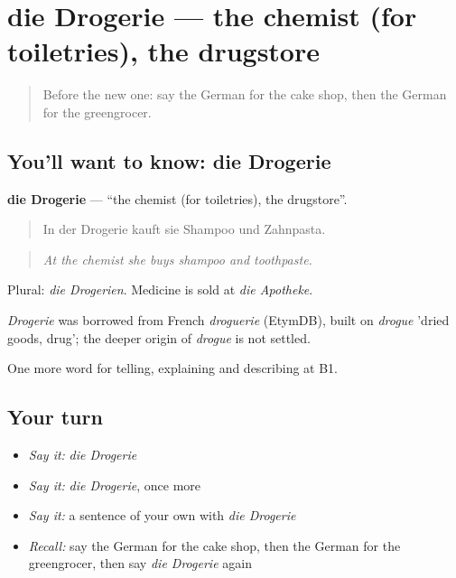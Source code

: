 \section[die Drogerie]{die Drogerie — the chemist (for toiletries), the drugstore}

\label{lesson:GE-C443-drogerie}



\begin{quote}
Before the new one: say the German for the cake shop, then the German for the greengrocer.
\end{quote}

\subsection*{You'll want to know: die Drogerie}
\textbf{die Drogerie} — \textquotedblleft{}the chemist (for toiletries), the drugstore\textquotedblright{}.

\begin{quote}
In der Drogerie kauft sie Shampoo und Zahnpasta.
\end{quote}

\begin{quote}
\emph{At the chemist she buys shampoo and toothpaste.}
\end{quote}

Plural: \emph{die Drogerien}. Medicine is sold at \emph{die Apotheke}.

\begin{cousinweb}
\emph{Drogerie} was borrowed from French \emph{droguerie} (EtymDB), built on \emph{drogue} 'dried goods, drug'; the deeper origin of \emph{drogue} is not settled.
\end{cousinweb}

\begin{grammarlens}[title={What you've built}]
One more word for telling, explaining and describing at B1.
\end{grammarlens}

\subsection*{Your turn}
\begin{itemize}
\raggedright
  \item \emph{Say it:} \emph{die Drogerie}
  \item \emph{Say it:} \emph{die Drogerie}, once more
  \item \emph{Say it:} a sentence of your own with \emph{die Drogerie}
  \item \emph{Recall:} say the German for the cake shop, then the German for the greengrocer, then say \emph{die Drogerie} again
\end{itemize}

